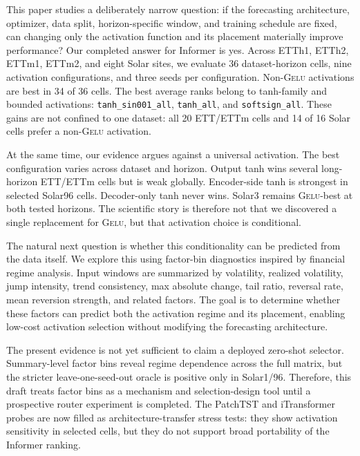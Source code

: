 \documentclass{article}
\newcommand{\gelu}{\textsc{Gelu}}
\newcommand{\patchtst}{PatchTST}
\newcommand{\itransformer}{iTransformer}
\begin{document}
This paper studies a deliberately narrow question: if the forecasting architecture, optimizer, data split, horizon-specific window, and training schedule are fixed, can changing only the activation function and its placement materially improve performance? Our completed answer for Informer is yes. Across ETTh1, ETTh2, ETTm1, ETTm2, and eight Solar sites, we evaluate 36 dataset-horizon cells, nine activation configurations, and three seeds per configuration. Non-\gelu{} activations are best in 34 of 36 cells. The best average ranks belong to tanh-family and bounded activations: \texttt{tanh\_sin001\_all}, \texttt{tanh\_all}, and \texttt{softsign\_all}. These gains are not confined to one dataset: all 20 ETT/ETTm cells and 14 of 16 Solar cells prefer a non-\gelu{} activation.

At the same time, our evidence argues against a universal activation. The best configuration varies across dataset and horizon. Output tanh wins several long-horizon ETT/ETTm cells but is weak globally. Encoder-side tanh is strongest in selected Solar96 cells. Decoder-only tanh never wins. Solar3 remains \gelu{}-best at both tested horizons. The scientific story is therefore not that we discovered a single replacement for \gelu{}, but that activation choice is conditional.

The natural next question is whether this conditionality can be predicted from the data itself. We explore this using factor-bin diagnostics inspired by financial regime analysis. Input windows are summarized by volatility, realized volatility, jump intensity, trend consistency, max absolute change, tail ratio, reversal rate, mean reversion strength, and related factors. The goal is to determine whether these factors can predict both the activation regime and its placement, enabling low-cost activation selection without modifying the forecasting architecture.

The present evidence is not yet sufficient to claim a deployed zero-shot selector. Summary-level factor bins reveal regime dependence across the full matrix, but the stricter leave-one-seed-out oracle is positive only in Solar1/96. Therefore, this draft treats factor bins as a mechanism and selection-design tool until a prospective router experiment is completed. The \patchtst{} and \itransformer{} probes are now filled as architecture-transfer stress tests: they show activation sensitivity in selected cells, but they do not support broad portability of the Informer ranking.
\end{document}
